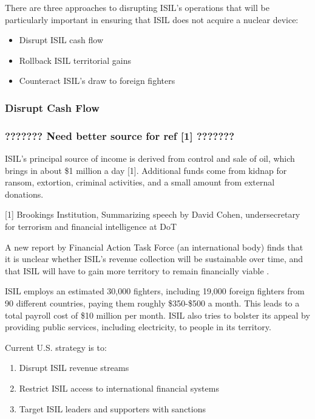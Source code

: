 \documentclass{report}
\begin{document}
There are three approaches to disrupting ISIL's operations that will be particularly important in ensuring that ISIL does not acquire a nuclear device:

\begin{itemize}
  \item Disrupt ISIL cash flow
  \item Rollback ISIL territorial gains
  \item Counteract ISIL's draw to foreign fighters
\end{itemize}

\subsubsection{Disrupt Cash Flow}

\subsubsection{???????  Need better source for ref [1]    ???????}

ISIL's principal source of income is derived from control and sale of oil, which brings in about \$1 million a day [1]. Additional funds come from kidnap for ransom, extortion, criminal activities, and a small amount from external donations. 

[1]  Brookings Institution, Summarizing speech by David Cohen, undersecretary for terrorism and financial intelligence at DoT

A new report by Financial Action Task Force (an international body) finds that it is unclear whether ISIL's revenue collection will be sustainable over time, and that ISIL will have to gain more territory to remain financially viable \cite{TheEditorialBoard2015,Report2015}.

ISIL employs an estimated 30,000 fighters, including 19,000 foreign fighters from 90 different countries, paying them roughly \$350-\$500 a month. This leads to a total payroll cost of \$10 million per month. ISIL also tries to bolster its appeal by providing public services, including electricity, to people in its territory. 

Current U.S. strategy is to:

\begin{enumerate}
  \item Disrupt ISIL revenue streams
  \item Restrict ISIL access to international financial systems
  \item Target ISIL leaders and supporters with sanctions
\end{enumerate}
\end{document}
